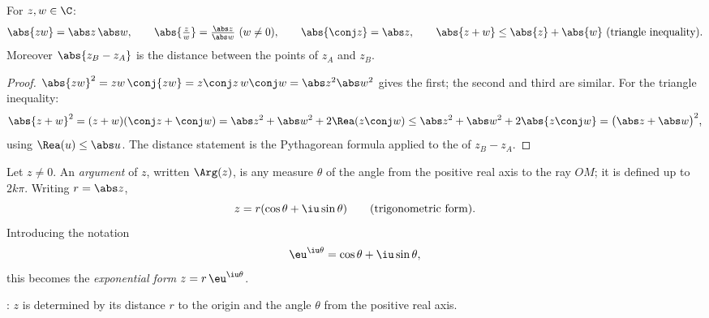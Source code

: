 \begin{proposition}\label{prop:g12:complex:modulus}
For $z, w \in \C$:
\[
\abs{zw} = \abs z\,\abs w, \qquad
\abs{\tfrac zw} = \tfrac{\abs z}{\abs w}\ (w \neq 0), \qquad
\abs{\conj z} = \abs z, \qquad
\abs{z + w} \leq \abs{z} + \abs{w} \ \text{(triangle inequality)}.
\]
Moreover $\abs{z_B - z_A}$ is the distance between the points of 
$z_A$ and $z_B$.
\end{proposition}

\begin{proof}
$\abs{zw}^2 = zw\,\conj{zw} = z\conj z\, w \conj w = \abs z^2 \abs w^2$
gives the first; the second and third are similar. For the triangle
inequality:
\[
\abs{z+w}^2 = (z+w)(\conj z + \conj w)
= \abs z^2 + \abs w^2 + 2\Rea(z \conj w)
\leq \abs z^2 + \abs w^2 + 2\abs{z\conj w}
= \bigl(\abs z + \abs w\bigr)^2,
\]
using $\Rea(u) \leq \abs u$. The distance statement is the Pythagorean
formula applied to the  of $z_B - z_A$.
\end{proof}

\begin{definition}\label{def:g12:complex:argument}
Let $z \neq 0$. An \emph{argument} of $z$, written
$\Arg(z)$, is any measure $\theta$ of the angle from the positive real axis
to the ray $OM$; it is defined up to $2k\pi$. Writing $r = \abs z$,
\[
z = r(\cos\theta + \iu\sin\theta)
\qquad\text{(trigonometric form)}.
\]
Introducing the notation
\[
\eu^{\iu\theta} = \cos\theta + \iu\sin\theta,
\]
this becomes the \emph{exponential form} $z = r\,\eu^{\iu\theta}$.
\end{definition}

\begin{omfigure}

{\small {}: $z$ is determined by its distance $r$ to the
origin and the angle $\theta$ from the positive real axis.}
\end{omfigure}

